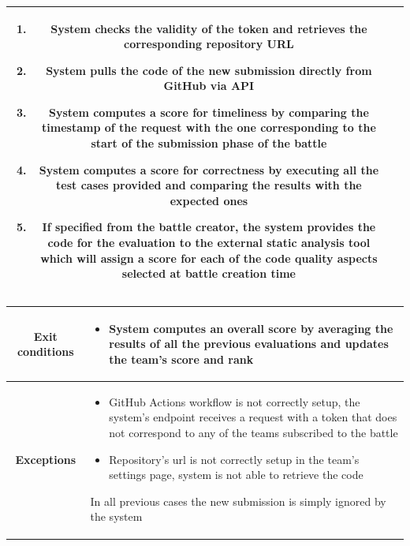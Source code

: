 \begin{center}
\begin{tabular}{ |c|m{10cm}| }
\begin{enumerate}
            \item System checks the validity of the token and retrieves the corresponding repository URL
            \item System pulls the code of the new submission directly from GitHub via API
            \item System computes a score for timeliness by comparing the timestamp of the request with the one corresponding to the start of the submission phase of the battle
            \item System computes a score for correctness by executing all the test cases provided and comparing the results with the expected ones
            \item If specified from the battle creator, the system provides the code for the evaluation to the external static analysis tool which will assign a score for each of the code quality aspects selected at battle creation time
        \end{enumerate} \\
        \hline
    \end{tabular}
    \newpage
    \begin{tabular}{ |c|m{10cm}| }
        \hline
        \textbf{Exit conditions} &
        \begin{itemize}
            \item System computes an overall score by averaging the results of all the previous evaluations and updates the team’s score and rank
        \end{itemize} \\
        \hline
        \textbf{Exceptions} & 
        \begin{itemize}
            \item GitHub Actions workflow is not correctly setup, the system’s endpoint receives a request with a token that does not correspond to any of the teams subscribed to the battle
            \item Repository’s url is not correctly setup in the team’s settings page, system is not able to retrieve the code
        \end{itemize} 
        In all previous cases the new submission is simply ignored by the system \\
        \hline
    \end{tabular}
    \begin{figure}[H]
        \hspace{15px}

\end{figure}
\end{center}

